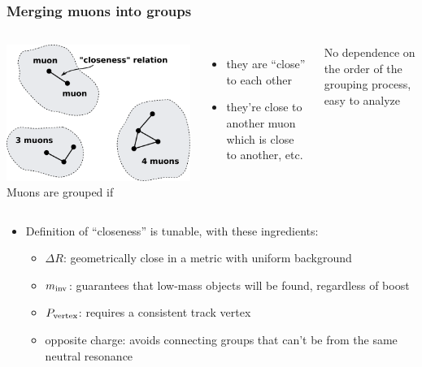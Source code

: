 \documentclass[compress]{beamer}
\newcommand{\s}[1]{{\mbox{\scriptsize #1}}}
\begin{document}
\begin{frame}
\frametitle{Merging muons into groups}

\vspace{0.5 cm}
\begin{columns}
\includegraphics[width=\linewidth]{closeness.pdf}
Muons are grouped if
\begin{itemize}
\item they are ``close'' to each other
\item they're close to another muon which is close to another, etc.
\end{itemize}

No dependence on the order of the grouping process, easy to analyze
\end{columns}

\begin{itemize}
\item Definition of ``closeness'' is tunable, with these ingredients:
\begin{itemize}\setlength{\itemsep}{0.1 cm}
\item $\Delta R$: geometrically close in a metric with uniform background
\item $m_\s{inv}$: guarantees that low-mass objects will be found, regardless of boost
\item $P_\s{vertex}$: requires a consistent track vertex
\item opposite charge: avoids connecting groups that can't be from the same neutral resonance
\end{itemize}
\end{itemize}
\end{frame}
\end{document}
